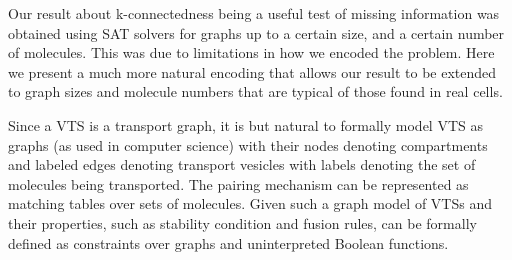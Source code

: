 Our result about k-connectedness being a useful test of missing information \cite{shukla} was obtained using SAT solvers for graphs up to a certain size, and a certain number of molecules. This was due to limitations in how we encoded the problem. Here we present a much more natural encoding that allows our result to be extended to graph sizes and molecule numbers that are typical of those found in real cells.


\label{subsec:graphmodel}
%
Since a VTS is a transport graph, it is but natural to formally model
VTS as graphs (as used in computer science) with their nodes denoting
compartments and labeled edges denoting transport vesicles with labels
denoting the set of molecules being transported. The pairing mechanism
can be represented as matching tables over sets of molecules.
%
Given such a graph model of VTSs and their properties, such as
stability condition and fusion rules, can be formally defined as
constraints over graphs and uninterpreted Boolean functions.
%
\
   


